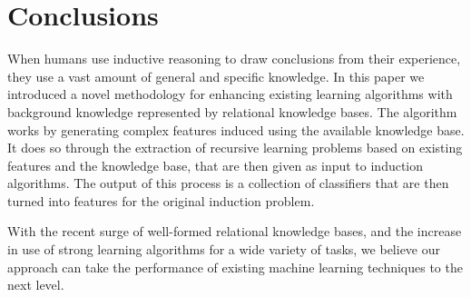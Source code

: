 \documentclass[letterpaper]{article} %
\theoremstyle{definition}
\begin{document}

\section{Conclusions}

When humans use inductive reasoning to draw conclusions from their experience, they use a vast amount of general and specific knowledge. In this paper we introduced a novel methodology for enhancing existing learning algorithms with background knowledge represented by relational knowledge bases.
The algorithm works by generating complex features induced using the available knowledge base. It does so through the extraction of recursive learning problems based on existing features and the knowledge base, that are then given as input to induction algorithms. The output of this process is a collection of classifiers that are then turned into features for the original induction problem.

With the recent surge of well-formed relational knowledge bases,
and the increase in use of strong learning algorithms for a wide variety of tasks,
we believe our approach can take the performance of existing machine learning techniques to the next level.

\clearpage


\end{document}
